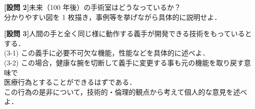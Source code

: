 \documentclass{jsarticle}
\begin{document}
\newpage

\textbf{{[設問 2]}}\hspace*{1zw}未来（100 年後）の手術室はどうなっているか？\\
\hspace*{5.7zw}分かりやすい図を 1 枚描き，事例等を挙げながら具体的に説明せよ．\\


\newpage

\textbf{{[設問 3]}}\hspace*{1zw}人間の手と全く同じ様に動作する義手が開発できる技術をもっているとする．\\
\hspace*{5.7zw}(3-1) この義手に必要不可欠な機能，性能などを具体的に述べよ．\\

\hspace*{4.7zw}(3-2) この場合，健康な腕を切断して義手に変更する事も元の機能を取り戻す意味で\\
\hspace*{8.4zw}医療行為とすることができるはずである．\\
\hspace*{8.4zw}この行為の是非について，技術的・倫理的観点から考えて個人的な意見を述べよ．\\
\end{document}
